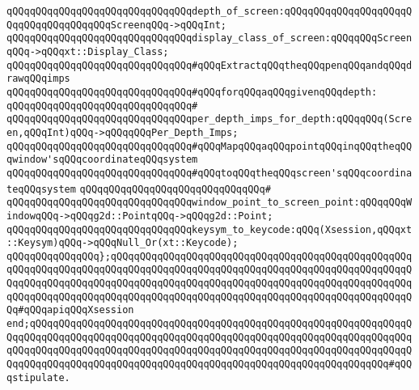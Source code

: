 \verb|qQQqqQQqqQQqqQQqqQQqqQQqqQQqqQQqdepth_of_screen:qQQqqQQqqQQqqQQqqQQqqQQqqQQqqQQqqQQqqQQqScreenqQQq->qQQqInt;|\newline
\newline
\verb|qQQqqQQqqQQqqQQqqQQqqQQqqQQqqQQqdisplay_class_of_screen:qQQqqQQqScreenqQQq->qQQqxt::Display_Class;|\newline
\newline
\verb|qQQqqQQqqQQqqQQqqQQqqQQqqQQqqQQq#qQQqExtractqQQqtheqQQqpenqQQqandqQQqdrawqQQqimps|\newline
\verb|qQQqqQQqqQQqqQQqqQQqqQQqqQQqqQQq#qQQqforqQQqaqQQqgivenqQQqdepth:|\newline
\verb|qQQqqQQqqQQqqQQqqQQqqQQqqQQqqQQq#|\newline
\verb|qQQqqQQqqQQqqQQqqQQqqQQqqQQqqQQqper_depth_imps_for_depth:qQQqqQQq(Screen,qQQqInt)qQQq->qQQqqQQqPer_Depth_Imps;|\newline
\newline
\verb|qQQqqQQqqQQqqQQqqQQqqQQqqQQqqQQq#qQQqMapqQQqaqQQqpointqQQqinqQQqtheqQQqwindow'sqQQqcoordinateqQQqsystem|\newline
\verb|qQQqqQQqqQQqqQQqqQQqqQQqqQQqqQQq#qQQqtoqQQqtheqQQqscreen'sqQQqcoordinateqQQqsystem|\newline
\verb|qQQqqQQqqQQqqQQqqQQqqQQqqQQqqQQq#|\newline
\verb|qQQqqQQqqQQqqQQqqQQqqQQqqQQqqQQqwindow_point_to_screen_point:qQQqqQQqWindowqQQq->qQQqg2d::PointqQQq->qQQqg2d::Point;|\newline
\newline
\verb|qQQqqQQqqQQqqQQqqQQqqQQqqQQqqQQqkeysym_to_keycode:qQQq(Xsession,qQQqxt::Keysym)qQQq->qQQqNull_Or(xt::Keycode);|\newline
\verb|qQQqqQQqqQQqqQQq};qQQqqQQqqQQqqQQqqQQqqQQqqQQqqQQqqQQqqQQqqQQqqQQqqQQqqQQqqQQqqQQqqQQqqQQqqQQqqQQqqQQqqQQqqQQqqQQqqQQqqQQqqQQqqQQqqQQqqQQqqQQqqQQqqQQqqQQqqQQqqQQqqQQqqQQqqQQqqQQqqQQqqQQqqQQqqQQqqQQqqQQqqQQqqQQqqQQqqQQqqQQqqQQqqQQqqQQqqQQqqQQqqQQqqQQqqQQqqQQqqQQqqQQqqQQqqQQqqQQqqQQq#qQQqapiqQQqXsession|\newline
\verb|end;qQQqqQQqqQQqqQQqqQQqqQQqqQQqqQQqqQQqqQQqqQQqqQQqqQQqqQQqqQQqqQQqqQQqqQQqqQQqqQQqqQQqqQQqqQQqqQQqqQQqqQQqqQQqqQQqqQQqqQQqqQQqqQQqqQQqqQQqqQQqqQQqqQQqqQQqqQQqqQQqqQQqqQQqqQQqqQQqqQQqqQQqqQQqqQQqqQQqqQQqqQQqqQQqqQQqqQQqqQQqqQQqqQQqqQQqqQQqqQQqqQQqqQQqqQQqqQQqqQQqqQQqqQQqqQQq#qQQqstipulate.|\newline
\newline

